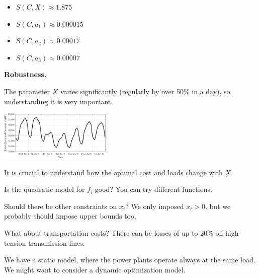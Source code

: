 \documentclass{workbook}
\begin{document}
\begin{solution}
\begin{slide}
\begin{parts}
		\item 	\begin{itemize}
			\item $S(C,X) \approx 1.875$
			\item $S(C,a_1) \approx 0.000015$
			\item $S(C,a_2) \approx 0.00017$
			\item $S(C,a_3) \approx 0.00007$
		\end{itemize}


	
\end{parts}
	
\end{slide}
	
\end{solution}


\begin{slide}

\question

\textbf{Robustness.} 

\begin{parts}
	\item The parameter $X$ varies significantly (regularly by over 50\% in a day), so understanding it is very important.

\begin{center}
	\includegraphics[width=0.4\textwidth]{images/energydemand.png}
\end{center}
	

It is crucial to understand how the optimal cost and loads change with $X$.


	\item Is the quadratic model for $f_i$ good? You can try different functions.
	\item Should there be other constraints on $x_i$? We only imposed $x_i>0$, but we probably should impose upper bounds too.
	\item What about transportation costs? There can be losses of up to 20\% on high-tension transmission lines.
	\item We have a static model, where the power plants operate always at the same load. We might want to consider a dynamic optimization model.
\end{parts}



\end{slide}
\end{document}
